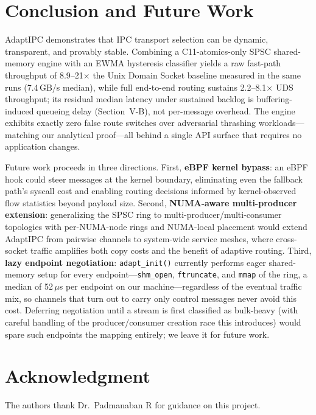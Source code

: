 \documentclass[conference]{IEEEtran}
\begin{document}
\section{Conclusion and Future Work}
AdaptIPC demonstrates that IPC transport selection can be dynamic,
transparent, and provably stable. Combining a C11-atomics-only SPSC
shared-memory engine with an EWMA hysteresis classifier yields a raw
fast-path throughput of 8.9--21$\times$ the Unix Domain Socket baseline
measured in the same runs (7.4\,GB/s median), while full end-to-end
routing sustains 2.2--8.1$\times$ UDS throughput; its residual median
latency under sustained backlog is buffering-induced queueing delay
(Section~V-B), not per-message overhead. The engine exhibits exactly zero false route
switches over adversarial thrashing workloads---matching our analytical
proof---all behind a single API surface that requires no application changes.

Future work proceeds in three directions. First, \textbf{eBPF kernel bypass}:
an eBPF hook could steer messages at the kernel boundary, eliminating even
the fallback path's syscall cost and enabling routing decisions informed by
kernel-observed flow statistics beyond payload size. Second,
\textbf{NUMA-aware multi-producer extension}: generalizing the SPSC ring to
multi-producer/multi-consumer topologies with per-NUMA-node rings and
NUMA-local placement would extend AdaptIPC from pairwise channels to
system-wide service meshes, where cross-socket traffic amplifies both copy
costs and the benefit of adaptive routing. Third, \textbf{lazy endpoint
negotiation}: \texttt{adapt\_init()} currently performs eager shared-memory
setup for every endpoint---\texttt{shm\_open}, \texttt{ftruncate}, and
\texttt{mmap} of the ring, a median of 52\,$\mu$s per endpoint on our
machine---regardless of the eventual traffic mix, so channels that turn out
to carry only control messages never avoid this cost. Deferring negotiation
until a stream is first classified as bulk-heavy (with careful handling of
the producer/consumer creation race this introduces) would spare such
endpoints the mapping entirely; we leave it for future work.

\section*{Acknowledgment}
The authors thank Dr.~Padmanaban R for guidance on this project.
\end{document}

